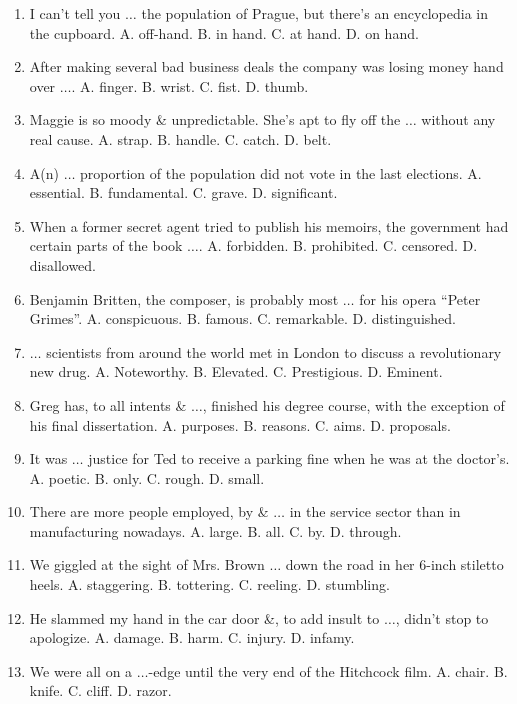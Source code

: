 \documentclass{article}
\numberwithin{equation}{section}
\begin{document}
\begin{enumerate}[leftmargin=2mm]
	\item I can't tell you $\ldots$ the population of Prague, but there's an encyclopedia in the cupboard. {\sf A.} off-hand. {\sf B.} in hand. {\sf C.} at hand. {\sf D.} on hand.
	\item After making several bad business deals the company was losing money hand over $\ldots$. {\sf A.} finger. {\sf B.} wrist. {\sf C.} fist. {\sf D.} thumb.
	\item Maggie is so moody \& unpredictable. She's apt to fly off the $\ldots$ without any real cause. {\sf A.} strap. {\sf B.} handle. {\sf C.} catch. {\sf D.} belt.
	\item A(n) $\ldots$ proportion of the population did not vote in the last elections. {\sf A.} essential. {\sf B.} fundamental. {\sf C.} grave. {\sf D.} significant.
	\item When a former secret agent tried to publish his memoirs, the government had certain parts of the book $\ldots$. {\sf A.} forbidden. {\sf B.} prohibited. {\sf C.} censored. {\sf D.} disallowed.
	\item Benjamin Britten, the composer, is probably most $\ldots$ for his opera ``Peter Grimes''. {\sf A.} conspicuous. {\sf B.} famous. {\sf C.} remarkable. {\sf D.} distinguished.
	\item $\ldots$ scientists from around the world met in London to discuss a revolutionary new drug. {\sf A.} Noteworthy. {\sf B.} Elevated. {\sf C.} Prestigious. {\sf D.} Eminent.
	\item Greg has, to all intents \& $\ldots$, finished his degree course, with the exception of his final dissertation. {\sf A.} purposes. {\sf B.} reasons. {\sf C.} aims. {\sf D.} proposals.
	\item It was $\ldots$ justice for Ted to receive a parking fine when he was at the doctor's. {\sf A.} poetic. {\sf B.} only. {\sf C.} rough. {\sf D.} small.
	\item There are more people employed, by \& $\ldots$ in the service sector than in manufacturing nowadays. {\sf A.} large. {\sf B.} all. {\sf C.} by. {\sf D.} through.
	\item We giggled at the sight of Mrs. Brown $\ldots$ down the road in her 6-inch stiletto heels. {\sf A.} staggering. {\sf B.} tottering. {\sf C.} reeling. {\sf D.} stumbling.
	\item He slammed my hand in the car door \&, to add insult to $\ldots$, didn't stop to apologize. {\sf A.} damage. {\sf B.} harm. {\sf C.} injury. {\sf D.} infamy.
	\item We were all on a $\ldots$-edge until the very end of the Hitchcock film. {\sf A.} chair. {\sf B.} knife. {\sf C.} cliff. {\sf D.} razor.

\end{enumerate}
\end{document}
